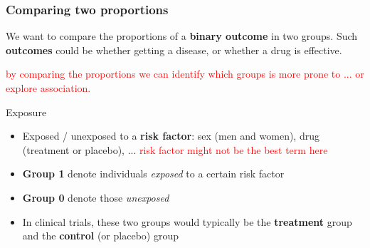 \documentclass[compress, notes=hide]{beamer}
\newcommand{\hl}[1]{\textbf{#1}}
\begin{document}
\begin{frame}
  \frametitle{Comparing two proportions}
  We want to compare the proportions of a \textbf{binary outcome} in two groups. Such \textbf{outcomes} could be whether getting a disease, or whether a drug is effective. 
  
  \textcolor{red}{by comparing the proportions we can identify which groups is more prone to ... or explore association.}
\begin{block}{Exposure}
\begin{itemize}
 \item Exposed / unexposed to a \textbf{risk factor}: sex (men and women), drug (treatment or placebo), ...   \textcolor{red}{risk factor might not be the best term here}


\item \hl{Group 1} denote individuals \emph{exposed} to a
  certain risk factor
  
  \item \hl{Group 0} denote those \emph{unexposed}
  
\item In clinical trials, these two groups would typically be the \hl{treatment} group and the \hl{control} (or placebo) group
\end{itemize}
\end{block}
\end{frame}
\end{document}
